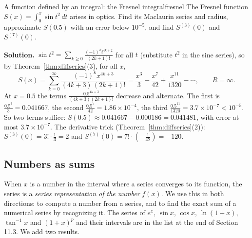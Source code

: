 \documentclass[11pt]{article}
\begin{document}
\begin{exmp}{A function defined by an integral: the Fresnel integral}{fresnel}
The Fresnel function $S(x)=\displaystyle\int_0^x\sin t^2\,dt$ arises in optics. Find its Maclaurin series and radius, approximate $S(0.5)$ with an error below $10^{-5}$, and find $S^{(3)}(0)$ and $S^{(7)}(0)$.

\textbf{Solution.} $\sin t^2=\sum_{k\ge0}\frac{(-1)^kt^{4k+2}}{(2k+1)!}$ for all $t$ (substitute $t^2$ in the sine series), so by Theorem~\ref{thm:diffseries}(3), for all $x$,
\[
S(x)=\sum_{k=0}^\infty\frac{(-1)^kx^{4k+3}}{(4k+3)\,(2k+1)!}=\frac{x^3}3-\frac{x^7}{42}+\frac{x^{11}}{1320}-\cdots,\qquad R=\infty .
\]
At $x=0.5$ the terms $\frac{0.5^{4k+3}}{(4k+3)(2k+1)!}$ decrease and alternate. The first is $\frac{0.5^3}3=0.041667$, the second $\frac{0.5^7}{42}=1.86\times10^{-4}$, the third $\frac{0.5^{11}}{1320}=3.7\times10^{-7}<10^{-5}$. So two terms suffice: $S(0.5)\approx0.041667-0.000186=0.041481$, with error at most $3.7\times10^{-7}$. The derivative trick (Theorem~\ref{thm:diffseries}(2)): $S^{(3)}(0)=3!\cdot\frac13=2$ and $S^{(7)}(0)=7!\cdot\left(-\frac1{42}\right)=-120$.
\end{exmp}

\subsection*{Numbers as sums}

When $x$ is a number in the interval where a series converges to its function, the series is a \emph{series representation of the number} $f(x)$. We use this in both directions: to compute a number from a series, and to find the exact sum of a numerical series by recognizing it. The series of $e^x$, $\sin x$, $\cos x$, $\ln(1+x)$, $\tan^{-1}x$ and $(1+x)^p$ and their intervals are in the list at the end of Section 11.3. We add two results.
\end{document}
